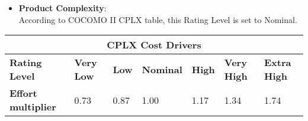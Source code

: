 \begin{itemize}
\item \textbf{Product Complexity}:\\
According to COCOMO II CPLX table, this Rating Level is set to Nominal.
\end{itemize}
\hspace*{-3cm}\begin{tabular}{|p{3cm}|p{2cm}|p{2cm}|p{2cm}|p{2cm}|p{2cm}|p{2cm}|}
\hline
\multicolumn{7}{|c|}{\textbf{CPLX Cost Drivers}}\\
\hline
\hline
\textbf{Rating Level} & \textbf{Very Low} & \textbf{Low} & \textbf{Nominal} & \textbf{High} & \textbf{Very High} & \textbf{Extra High}\\
\hline
\textbf{Effort multiplier} & 0.73 & 0.87 & 1.00 & 1.17 & 1.34 & 1.74\\
\hline 
\end{tabular}